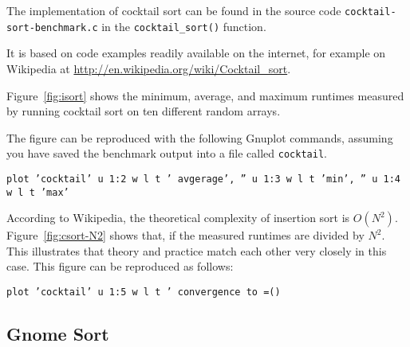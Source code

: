 \documentclass[a4paper,10pt]{article}
\begin{document}
The implementation of cocktail sort can be found in the source code \texttt{cocktail\--sort\--benchmark.c} in the \texttt{cocktail\_sort()} function.

It is based on code examples readily available on the internet, for example on Wikipedia at \url{http://en.wikipedia.org/wiki/Cocktail_sort}.

Figure~\ref{fig:isort} shows the minimum, average, and maximum runtimes measured by running cocktail sort on ten different random arrays.

The figure can be reproduced with the following Gnuplot commands, assuming you have saved the benchmark output into a file called \texttt{cocktail}.

\smallskip
 \texttt{plot 'cocktail' u 1:2 w l t ' avgerage', '' u 1:3 w l t 'min', '' u 1:4 w l t 'max'}
\smallskip

According to Wikipedia, the theoretical complexity of insertion sort is $O(N^2)$.
Figure~\ref{fig:csort-N2} shows that, if the measured runtimes are divided by $N^2$.
This illustrates that theory and practice match each other very closely in this case.
This figure can be reproduced as follows:

\smallskip
 \texttt{plot 'cocktail' u 1:5 w l t ' convergence to =()}
\smallskip

\subsection*{Gnome Sort}
\end{document}
